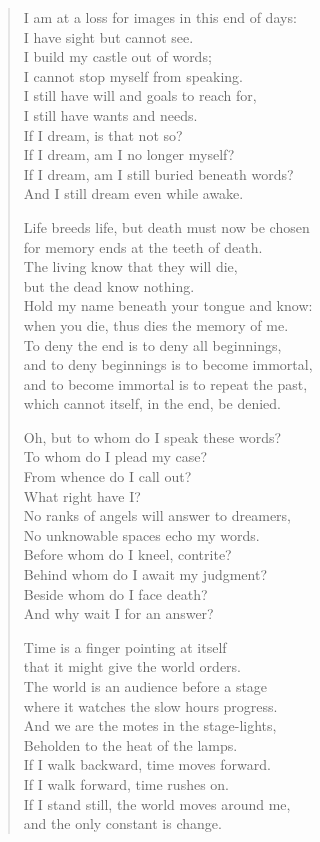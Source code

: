 \begin{quote}
I am at a loss for images in this end of days:\\
I have sight but cannot see.\\
I build my castle out of words;\\
I cannot stop myself from speaking.\\
I still have will and goals to reach for,\\
I still have wants and needs.\\
If I dream, is that not so?\\
If I dream, am I no longer myself?\\
If I dream, am I still buried beneath words?\\
And I still dream even while awake.

Life breeds life, but death must now be chosen\\
for memory ends at the teeth of death.\\
The living know that they will die,\\
but the dead know nothing.\\
Hold my name beneath your tongue and know:\\
when you die, thus dies the memory of me.\\
To deny the end is to deny all beginnings,\\
and to deny beginnings is to become immortal,\\
and to become immortal is to repeat the past,\\
which cannot itself, in the end, be denied.

Oh, but to whom do I speak these words?\\
To whom do I plead my case?\\
From whence do I call out?\\
What right have I?\\
No ranks of angels will answer to dreamers,\\
No unknowable spaces echo my words.\\
Before whom do I kneel, contrite?\\
Behind whom do I await my judgment?\\
Beside whom do I face death?\\
And why wait I for an answer?

Time is a finger pointing at itself\\
that it might give the world orders.\\
The world is an audience before a stage\\
where it watches the slow hours progress.\\
And we are the motes in the stage-lights,\\
Beholden to the heat of the lamps.\\
If I walk backward, time moves forward.\\
If I walk forward, time rushes on.\\
If I stand still, the world moves around me,\\
and the only constant is change.


\end{quote}
